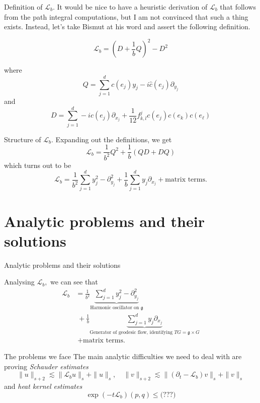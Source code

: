 \documentclass{beamer}
\numberwithin{equation}{section}
\theoremstyle{plain}
\theoremstyle{plain}
\theoremstyle{definition}
\theoremstyle{plain}
\theoremstyle{plain}
\theoremstyle{definition}
\newcommand{\Lc}{\mathcal{L}}
\newcommand{\gf}{\mathfrak{g}}
\begin{document}
\begin{frame}{Definition of $\Lc_b.$}
  It would be nice to have a heuristic derivation of $\Lc_b$ that follows from the path integral computations, but I am not convinced that such a thing exists. Instead, let's take Bismut at his word and assert the following definition.
  \begin{definition}
    \[
      \Lc_b = (D+\frac1bQ)^2-D^2
    \]
  \end{definition}
  where
  \[
    Q = \sum_{j=1}^d c(e_j)y_j-i\widehat{c}(e_j)\partial_{y_j}
  \]
  and 
  \[
    D = \sum_{j=1}^d -ic(e_j)\partial_{x_j}+\frac{1}{12}f^j_{k,l}c(e_j)c(e_k)c(e_\ell)
  \]
\end{frame}

\begin{frame}{Structure of $\Lc_b.$}
  Expanding out the definitions, we get
  \[
    \Lc_b = \frac{1}{b^2}Q^2+\frac{1}{b}(QD+DQ)
  \]
  which turns out to be
  \[
    \Lc_b = \frac{1}{b^2}\sum_{j=1}^d y_j^2-\partial_{y_j}^2 + \frac{1}{b}\sum_{j=1}^dy_j\partial_{x_j} + \text{matrix terms.}
  \]
\end{frame}

\section{Analytic problems and their solutions}

\begin{frame}
  \huge{Analytic problems and their solutions}
\end{frame}

\begin{frame}
  Analysing $\Lc_b,$ we can see that 
  \begin{align*}
    \Lc_b &= \frac{1}{b^2}\underbrace{\sum_{j=1}^d y_j^2-\partial_{y_j}^2}_{\text{Harmonic oscillator on } \gf}\\
          &\;+ \frac{1}{b}\underbrace{\sum_{j=1}^d y_j\partial_{x_j}}_{\text{Generator of geodesic flow, identifying }TG=\gf\times G}\\
          &\;+ \text{matrix terms.}
  \end{align*}
\end{frame}

\begin{frame}{The problems we face}
  The main analytic difficulties we need to deal with are proving \emph{Schauder estimates}
  \[
    \|u\|_{s+2} \lesssim \|\Lc_bu\|_s+\|u\|_s,\quad \|v\|_{s+2} \lesssim \|(\partial_t-\Lc_b)v\|_s+\|v\|_s
  \]
  and \emph{heat kernel estimates}
  \[
    \exp(-t\Lc_b)(p,q) \leq \text{(???)}
  \]
\end{frame}
\end{document}
